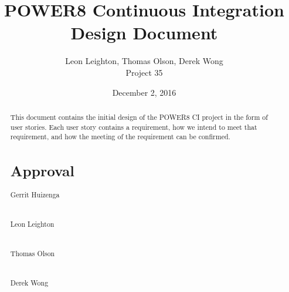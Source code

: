 \documentclass[10pt,letterpaper,onecolumn,journal]{IEEEtran}
\begin{document}
\begin{titlepage}
  \title{POWER8 Continuous Integration\\ Design Document}
  \author{Leon Leighton, Thomas Olson, Derek Wong\\Project 35}
  \date{December 2, 2016}
  \maketitle
  \vspace{4cm}
  \begin{abstract}
  \noindent This document contains the initial design of the POWER8 CI project in the form of user stories.
    Each user story contains a requirement, how we intend to meet that requirement, and how the meeting of the requirement can be confirmed.
    
    \bigskip
    \bigskip
    \bigskip
    \bigskip
    \bigskip
    \bigskip
 \section*{Approval}
    \bigskip
    \bigskip
    \bigskip
\noindent Gerrit Huizenga\hspace{0.7cm} \makebox[1.5in]{\hrulefill}\\\\\\
Leon Leighton\hspace{0.85cm} \makebox[1.5in]{\hrulefill}\\\\\\
Thomas Olson\hspace{0.9cm} \makebox[1.5in]{\hrulefill}\\\\\\
Derek Wong\hspace{1.2cm} \makebox[1.5in]{\hrulefill}\\\\\\

 \end{abstract}
\end{titlepage}

\tableofcontents
\clearpage
\end{document}
